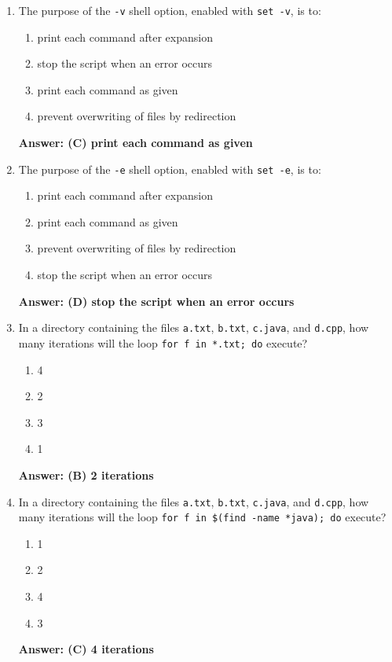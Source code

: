 \documentclass{article}
\begin{document}
\begin{enumerate}
  \item The purpose of the \texttt{-v} shell option, enabled with \texttt{set -v}, is to:
  \begin{enumerate}[label=(\Alph*)]
    \item print each command after expansion
    \item stop the script when an error occurs
    \item print each command as given
    \item prevent overwriting of files by redirection
  \end{enumerate}
  \textbf{Answer: (C) print each command as given}

  \item The purpose of the \texttt{-e} shell option, enabled with \texttt{set -e}, is to:
  \begin{enumerate}[label=(\Alph*)]
    \item print each command after expansion
    \item print each command as given
    \item prevent overwriting of files by redirection
    \item stop the script when an error occurs
  \end{enumerate}
  \textbf{Answer: (D) stop the script when an error occurs}

  \item In a directory containing the files \texttt{a.txt}, \texttt{b.txt}, \texttt{c.java}, and \texttt{d.cpp}, how many iterations will the loop \texttt{for f in *.txt; do} execute?
  \begin{enumerate}[label=(\Alph*)]
    \item 4
    \item 2
    \item 3
    \item 1
  \end{enumerate}
  \textbf{Answer: (B) 2 iterations}

  \item In a directory containing the files \texttt{a.txt}, \texttt{b.txt}, \texttt{c.java}, and \texttt{d.cpp}, how many iterations will the loop \texttt{for f in \$(find -name *java); do} execute?
  \begin{enumerate}[label=(\Alph*)]
    \item 1
    \item 2
    \item 4
    \item 3
  \end{enumerate}
  \textbf{Answer: (C) 4 iterations}


\end{enumerate}
\end{document}
